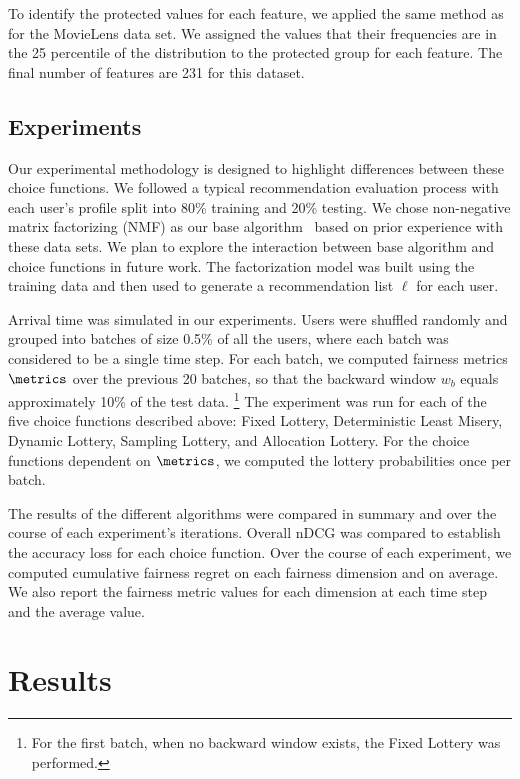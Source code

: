 To identify the protected values for each feature, we applied the same method as for the MovieLens data set. We assigned the values that their frequencies are in the 25 percentile of the distribution to the protected group for each feature. The final number of features are 231 for this dataset. 


\subsection{Experiments}
Our experimental methodology is designed to highlight differences between these choice functions. We followed a typical recommendation evaluation process with each user's profile split into 80\% training and 20\% testing. We chose non-negative matrix factorizing (NMF) as our base algorithm~\cite{takacs2008investigation} based on prior experience with these data sets. We plan to explore the interaction between base algorithm and choice functions in future work. The factorization model was built using the training data and then used to generate a recommendation list $\ell$ for each user.

Arrival time was simulated in our experiments. Users were shuffled randomly and grouped into batches of size 0.5\% of all the users, where each batch was considered to be a single time step. For each batch, we computed fairness metrics $\metrics$ over the previous 20 batches, so that the backward window $w_b$ equals approximately 10\% of the test data. \footnote{For the first batch, when no backward window exists, the Fixed Lottery was performed.} The experiment was run for each of the five choice functions described above: Fixed Lottery, Deterministic Least Misery, Dynamic Lottery, Sampling Lottery, and Allocation Lottery. For the choice functions dependent on $\metrics$, we computed the lottery probabilities once per batch. 

The results of the different algorithms were compared in summary and over the course of each experiment's iterations. Overall nDCG was compared to establish the accuracy loss for each choice function. Over the course of each experiment, we computed cumulative fairness regret on each fairness dimension and on average. We also report the fairness metric values for each dimension at each time step and the average value. 

\section{Results}

